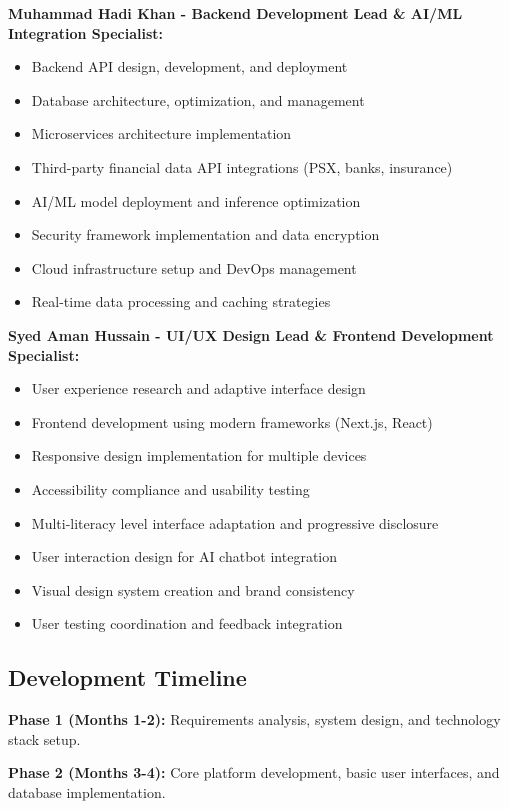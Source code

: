 \documentclass[conference]{IEEEtran}
\begin{document}
\textbf{Muhammad Hadi Khan - Backend Development Lead \& AI/ML Integration Specialist:}
\begin{itemize}
    \item Backend API design, development, and deployment
    \item Database architecture, optimization, and management
    \item Microservices architecture implementation
    \item Third-party financial data API integrations (PSX, banks, insurance)
    \item AI/ML model deployment and inference optimization
    \item Security framework implementation and data encryption
    \item Cloud infrastructure setup and DevOps management
    \item Real-time data processing and caching strategies
\end{itemize}

\textbf{Syed Aman Hussain - UI/UX Design Lead \& Frontend Development Specialist:}
\begin{itemize}
    \item User experience research and adaptive interface design
    \item Frontend development using modern frameworks (Next.js, React)
    \item Responsive design implementation for multiple devices
    \item Accessibility compliance and usability testing
    \item Multi-literacy level interface adaptation and progressive disclosure
    \item User interaction design for AI chatbot integration
    \item Visual design system creation and brand consistency
    \item User testing coordination and feedback integration
\end{itemize}

\subsection{Development Timeline}

\textbf{Phase 1 (Months 1-2):} Requirements analysis, system design, and technology stack setup.

\textbf{Phase 2 (Months 3-4):} Core platform development, basic user interfaces, and database implementation.
\end{document}
